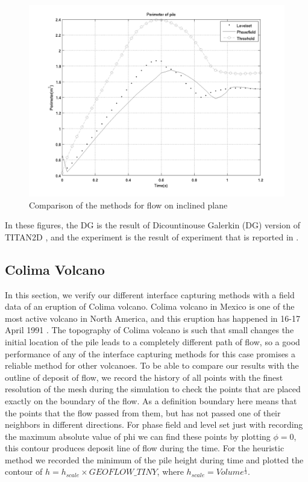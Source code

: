 \documentclass[letterpaper,10pt]{article}
\begin{document}
\begin{figure}[H]
\begin{minipage}[b]{.48 \linewidth}
    \includegraphics[scale=0.4]{IMAGES/perimeter.png}
  \end{minipage}
  \caption{Comparison of the methods for flow on inclined plane}
  \label{compinc}
\end{figure}

In these figures, the DG is the result of Dicountinouse Galerkin (DG) version of TITAN2D \cite{}, and the experiment is the result of experiment 
that is reported in \cite{}.


\subsection{Colima Volcano}
In this section, we verify our different interface capturing methods with a field data of an eruption of Colima volcano. 
Colima volcano in Mexico is one of the most active volcano in North America, and this eruption has happened in 16-17 April 1991 \cite{}. 
The topography of Colima volcano is such that small changes the initial location of the pile leads to a completely different 
path of flow, so a good performance of any of the interface capturing methods for this case promises a reliable method for other volcanoes.
To be able to compare our results with the outline of deposit of flow, we record the history of all points with the finest 
resolution of the mesh during the simulation to check the points that are placed exactly on the boundary of the flow. 
As a definition boundary here means that the points that the flow passed from them, but has not passed one of their neighbors 
in different directions. For phase field and level set just with recording the maximum absolute value of phi we can find 
these points by plotting $\phi=0$, this contour produces deposit line of flow during the time. For the heuristic method we 
recorded the minimum of the pile height during time and plotted the contour of $ h = h_{scale} \times GEOFLOW \_ TINY$, where 
$ h_{scale} =Volume^\frac{1}{3} $.
\end{document}
